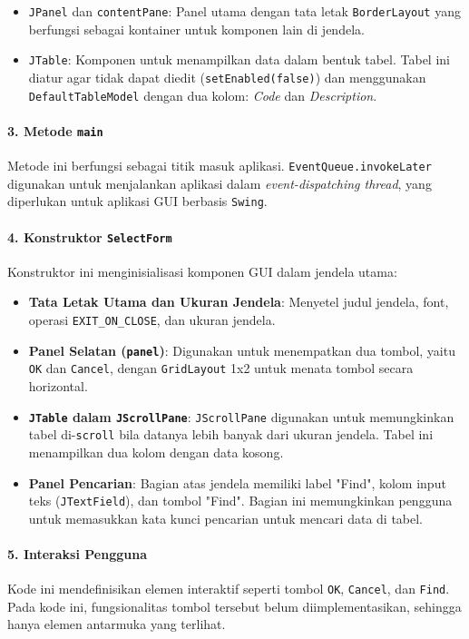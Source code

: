 \begin{itemize}
	\item \texttt{JPanel} dan \texttt{contentPane}: Panel utama dengan tata letak \texttt{BorderLayout} yang berfungsi sebagai kontainer untuk komponen lain di jendela.
	\item \texttt{JTable}: Komponen untuk menampilkan data dalam bentuk tabel. Tabel ini diatur agar tidak dapat diedit (\texttt{setEnabled(false)}) dan menggunakan \texttt{DefaultTableModel} dengan dua kolom: \textit{Code} dan \textit{Description}.
\end{itemize}

\paragraph{3. Metode \texttt{main}}
Metode ini berfungsi sebagai titik masuk aplikasi. \texttt{EventQueue.invokeLater} digunakan untuk menjalankan aplikasi dalam \textit{event-dispatching thread}, yang diperlukan untuk aplikasi GUI berbasis \texttt{Swing}.

\paragraph{4. Konstruktor \texttt{SelectForm}}
Konstruktor ini menginisialisasi komponen GUI dalam jendela utama:
\begin{itemize}
	\item \textbf{Tata Letak Utama dan Ukuran Jendela}: Menyetel judul jendela, font, operasi \texttt{EXIT\_ON\_CLOSE}, dan ukuran jendela.
	\item \textbf{Panel Selatan (\texttt{panel})}: Digunakan untuk menempatkan dua tombol, yaitu \texttt{OK} dan \texttt{Cancel}, dengan \texttt{GridLayout} 1x2 untuk menata tombol secara horizontal.
	\item \textbf{\texttt{JTable} dalam \texttt{JScrollPane}}: \texttt{JScrollPane} digunakan untuk memungkinkan tabel di-\texttt{scroll} bila datanya lebih banyak dari ukuran jendela. Tabel ini menampilkan dua kolom dengan data kosong.
	\item \textbf{Panel Pencarian}: Bagian atas jendela memiliki label "Find", kolom input teks (\texttt{JTextField}), dan tombol "Find". Bagian ini memungkinkan pengguna untuk memasukkan kata kunci pencarian untuk mencari data di tabel.
\end{itemize}

\paragraph{5. Interaksi Pengguna}
Kode ini mendefinisikan elemen interaktif seperti tombol \texttt{OK}, \texttt{Cancel}, dan \texttt{Find}. Pada kode ini, fungsionalitas tombol tersebut belum diimplementasikan, sehingga hanya elemen antarmuka yang terlihat.




